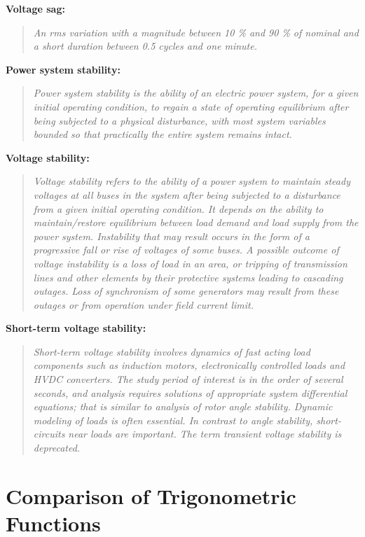 \textbf{Voltage sag:}
\begin{quote}\itshape
    An rms variation with a magnitude between 10 \% and 90 \% of nominal and a short duration between 0.5 cycles and one minute.
\end{quote}

\textbf{Power system stability:}
\begin{quote}\itshape
    Power system stability is the ability of an electric power system, for a given initial operating condition, to regain a state of operating equilibrium after being subjected to a physical disturbance, with most system variables bounded so that practically the entire system remains intact.
\end{quote}

\textbf{Voltage stability:}
\begin{quote}\itshape
    Voltage stability refers to the ability of a power system to maintain steady voltages at all buses in the system after being subjected to a disturbance from a given initial operating condition. 
    It depends on the ability to maintain/restore equilibrium between load demand and load supply from the power system. 
    Instability that may result occurs in the form of a progressive fall or rise of voltages of some buses. 
    A possible outcome of voltage instability is a loss of load in an area, or tripping of transmission lines and other elements by their protective systems leading to cascading outages. 
    Loss of synchronism of some generators may result from these outages or from operation under field current limit.
\end{quote}

\textbf{Short-term voltage stability:}
\begin{quote}\itshape
    Short-term voltage stability involves dynamics of fast acting load components such as induction motors, electronically controlled loads and HVDC converters. 
    The study period of interest is in the order of several seconds, and analysis requires solutions of appropriate system differential equations; that is similar to analysis of rotor angle stability. 
    Dynamic modeling of loads is often essential. 
    In contrast to angle stability, short-circuits near loads are important. 
    The term transient voltage stability is deprecated.
\end{quote}

\section{Comparison of Trigonometric Functions}
\label{app:trogonometric-func-comp}

